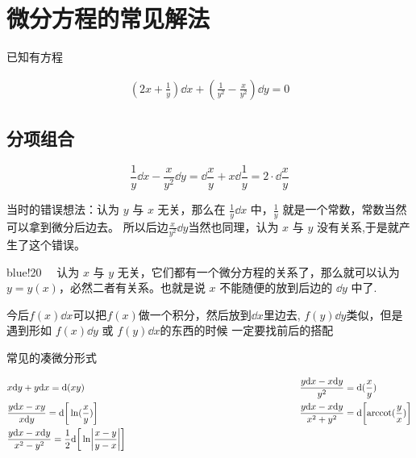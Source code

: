 \newcommand{\dis}{\displaystyle}


\section{微分方程的常见解法}
已知有方程
\begin{framed}
    \begin{align*}
        (2x + \frac{1}{y}) \dd x  + (\frac{1}{y^2}-\frac{x}{y^2})\dd y = 0
    \end{align*}      
\end{framed}
    
\subsection{分项组合}
\[\frac{1}{y}\dd x -\frac{x}{y^2}\dd y=\dd\frac{x}{y}+x\dd\frac{1}{y}=2\cdot \dd\frac{x}{y}\] 

当时的错误想法：认为 $y$ 与 $x$ 无关，那么在 $\frac{1}{y}\dd x$ 中，$\frac{1}{y}$ 就是一个常数，常数当然可以拿到微分后边去。
所以后边$\dis \frac{x}{y^2}\dd y$当然也同理，认为 $x$ 与 $y$ 没有关系,于是就产生了这个错误。

\begin{formal}{blue!20}
    ~~认为 $x$ 与 $y$ 无关，它们都有一个微分方程的关系了，那么就可以认为 $y=y(x)$，必然二者有关系。也就是说 $x$ 不能随便的放到后边的 $\dd y$ 中了.
    
    今后$f(x)\dd x$可以把$f(x)$做一个积分，然后放到$\dd x$里边去, $f(y)\dd y$类似，但是遇到形如 $f(x)\dd y$ 或 $f(y)\dd x$的东西的时候
    一定要找前后的搭配
\end{formal}



\textsf{常见的凑微分形式}

\begin{corollary}[常见的凑微分形式]
\begin{align*}
    & x\dd y + y\dd x = \dd(xy)            \hspace*{22em}                          & & \frac{y\dd x-x\dd y}{y^2}=\dd(\frac{x}{y}) \\
    & \frac{y\dd x -xy}{x\dd y} = \dd\bigg[\ln(\frac{x}{y})\bigg]                  & & \frac{y\dd x-x\dd y}{x^2+y^2}=\dd\bigg[{\rm arccot}(\frac{y}{x})\bigg]\\
    & \frac{y\dd x-x\dd y}{x^2-y^2}=\frac{1}{2}\dd\bigg[\ln\biggl|\frac{x-y}{y-x}\biggr|\bigg] & & 
\end{align*} 
\end{corollary}

